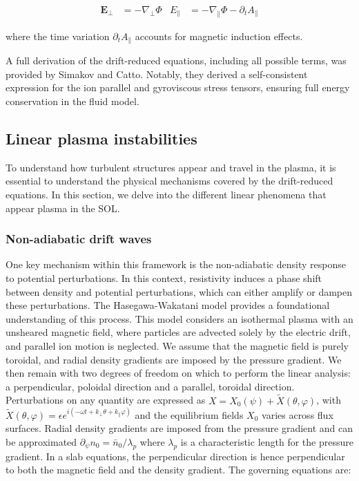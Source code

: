 \begin{align}
	\mathbf{E}_\perp &= -\nabla_\perp \Phi &
	E_\parallel &= -\nabla_\parallel \Phi - \partial_t A_\parallel
\end{align}

where the time variation $\partial_t A_\parallel$ accounts for magnetic induction effects. \newline

A full derivation of the drift-reduced equations, including all possible terms, was provided by Simakov and Catto\cite{simakov_2003}. Notably, they derived a self-consistent expression for the ion parallel and gyroviscous stress tensors, ensuring full energy conservation in the fluid model.




\subsection{Linear plasma instabilities}
\label{ssec:edge_linearDriftWaves}

To understand how turbulent structures appear and travel in the plasma, it is essential to understand the physical mechanisms covered by the drift-reduced equations. In this section, we delve into the different linear phenomena that appear plasma in the SOL.



\subsubsection{Non-adiabatic drift waves}
\label{ssec:edge_nonAdiabaticResponse}
One key mechanism within this framework is the non-adiabatic density response to potential perturbations. In this context, resistivity induces a phase shift between density and potential perturbations, which can either amplify or dampen these perturbations. The Hasegawa-Wakatani model\cite{hasegawa1983plasma} provides a foundational understanding of this process. This model considers an isothermal plasma with an unsheared magnetic field, where particles are advected solely by the electric drift, and parallel ion motion is neglected. We assume that the magnetic field is purely toroidal, and radial density gradients are imposed by the pressure gradient. We then remain with two degrees of freedom on which to perform the linear analysis: a perpendicular, poloidal direction and a parallel, toroidal direction. Perturbations on any quantity are expressed as $ X = X_0(\psi) + \tilde{X}(\theta,\varphi) $, with $\tilde{X}(\theta,\varphi) = \epsilon e^{i(-\omega t + k_\perp\theta+k_\parallel\varphi )}$ and the equilibrium fields $ X_0 $ varies across flux surfaces. Radial density gradients are imposed from the pressure gradient and can be approximated $\partial_\psi n_0 = \bar{n}_0 / \lambda_p$ where $\lambda_p$ is a characteristic length for the pressure gradient. In a slab equations, the perpendicular direction is hence perpendicular to both the magnetic field and the density gradient. The governing equations are:

